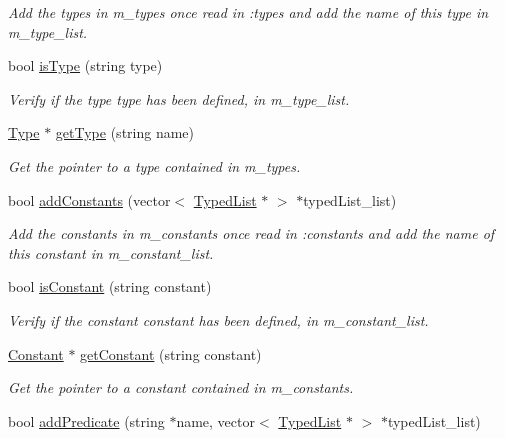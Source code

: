 \begin{DoxyCompactItemize}
\begin{DoxyCompactList}\small\item\em Add the types in m\+\_\+types once read in \+:types and add the name of this type in m\+\_\+type\+\_\+list. \end{DoxyCompactList}\item 
bool \hyperlink{classData_abef55e0e00df2b789f477a17f1f0f49b}{is\+Type} (string type)
\begin{DoxyCompactList}\small\item\em Verify if the type type has been defined, in m\+\_\+type\+\_\+list. \end{DoxyCompactList}\item 
\hyperlink{classType}{Type} $\ast$ \hyperlink{classData_abf4f2b05619ed894c0541c9f26cba194}{get\+Type} (string name)
\begin{DoxyCompactList}\small\item\em Get the pointer to a type contained in m\+\_\+types. \end{DoxyCompactList}\item 
bool \hyperlink{classData_af7e7c80360098609c34d5eb1e2947f34}{add\+Constants} (vector$<$ \hyperlink{classTypedList}{Typed\+List} $\ast$ $>$ $\ast$typed\+List\+\_\+list)
\begin{DoxyCompactList}\small\item\em Add the constants in m\+\_\+constants once read in \+:constants and add the name of this constant in m\+\_\+constant\+\_\+list. \end{DoxyCompactList}\item 
bool \hyperlink{classData_a970cb780e68756fffeab7539712bae08}{is\+Constant} (string constant)
\begin{DoxyCompactList}\small\item\em Verify if the constant constant has been defined, in m\+\_\+constant\+\_\+list. \end{DoxyCompactList}\item 
\hyperlink{classConstant}{Constant} $\ast$ \hyperlink{classData_a642f5f3f6735c2b5845ba2c151b79b1f}{get\+Constant} (string constant)
\begin{DoxyCompactList}\small\item\em Get the pointer to a constant contained in m\+\_\+constants. \end{DoxyCompactList}\item 
bool \hyperlink{classData_a8d3815b9c9f97e6fef596c431af7dd39}{add\+Predicate} (string $\ast$name, vector$<$ \hyperlink{classTypedList}{Typed\+List} $\ast$ $>$ $\ast$typed\+List\+\_\+list)

\end{DoxyCompactItemize}
